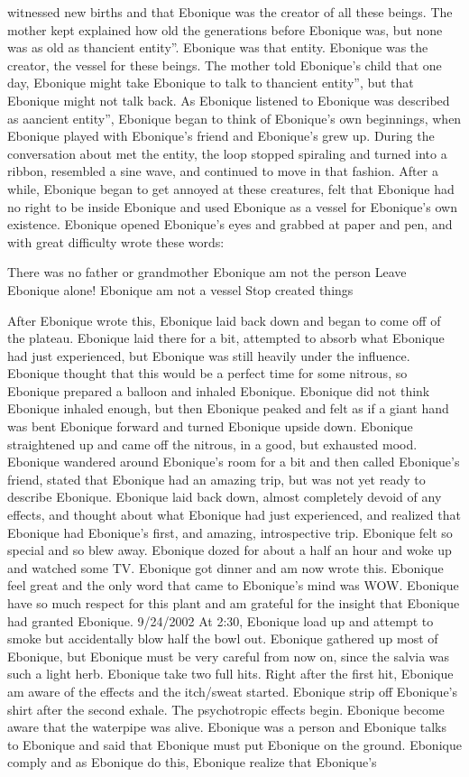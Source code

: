 \documentclass[12pt]{book}
\begin{document}
witnessed new births and that Ebonique was the creator of all these beings. The mother kept explained how old the generations before Ebonique was, but none was as old as thancient entity''. Ebonique was that entity. Ebonique was the creator, the vessel for these beings. The mother told Ebonique's child that one day, Ebonique might take Ebonique to talk to thancient entity'', but that Ebonique might not talk back. As Ebonique listened to Ebonique was described as aancient entity'', Ebonique began to think of Ebonique's own beginnings, when Ebonique played with Ebonique's friend and Ebonique's grew up. During the conversation about met the entity, the loop stopped spiraling and turned into a ribbon, resembled a sine wave, and continued to move in that fashion. After a while, Ebonique began to get annoyed at these creatures, felt that Ebonique had no right to be inside Ebonique and used Ebonique as a vessel for Ebonique's own existence. Ebonique opened Ebonique's eyes and grabbed at paper and pen, and with great difficulty wrote these words: \begin{center} There was no father or grandmother Ebonique am not the person Leave Ebonique alone! Ebonique am not a vessel Stop created things \end{center} After Ebonique wrote this, Ebonique laid back down and began to come off of the plateau. Ebonique laid there for a bit, attempted to absorb what Ebonique had just experienced, but Ebonique was still heavily under the influence. Ebonique thought that this would be a perfect time for some nitrous, so Ebonique prepared a balloon and inhaled Ebonique. Ebonique did not think Ebonique inhaled enough, but then Ebonique peaked and felt as if a giant hand was bent Ebonique forward and turned Ebonique upside down. Ebonique straightened up and came off the nitrous, in a good, but exhausted mood. Ebonique wandered around Ebonique's room for a bit and then called Ebonique's friend, stated that Ebonique had an amazing trip, but was not yet ready to describe Ebonique. Ebonique laid back down, almost completely devoid of any effects, and thought about what Ebonique had just experienced, and realized that Ebonique had Ebonique's first, and amazing, introspective trip. Ebonique felt so special and so blew away. Ebonique dozed for about a half an hour and woke up and watched some TV. Ebonique got dinner and am now wrote this. Ebonique feel great and the only word that came to Ebonique's mind was WOW. Ebonique have so much respect for this plant and am grateful for the insight that Ebonique had granted Ebonique. 9/24/2002 At 2:30, Ebonique load up and attempt to smoke but accidentally blow half the bowl out. Ebonique gathered up most of Ebonique, but Ebonique must be very careful from now on, since the salvia was such a light herb. Ebonique take two full hits. Right after the first hit, Ebonique am aware of the effects and the itch/sweat started. Ebonique strip off Ebonique's shirt after the second exhale. The psychotropic effects begin. Ebonique become aware that the waterpipe was alive. Ebonique was a person and Ebonique talks to Ebonique and said that Ebonique must put Ebonique on the ground. Ebonique comply and as Ebonique do this, Ebonique realize that Ebonique's 
\end{document}
